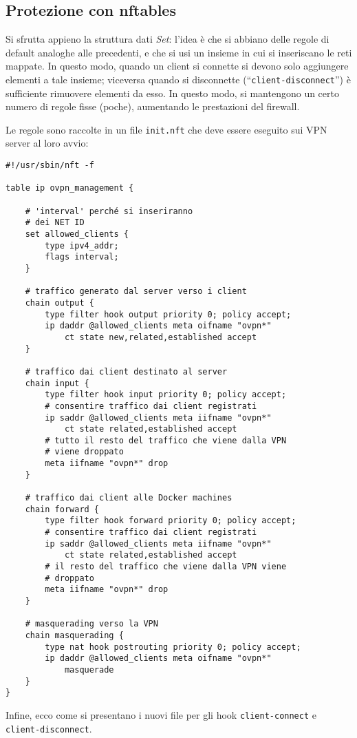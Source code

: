 \subsection{Protezione con nftables}
Si sfrutta appieno la struttura dati \textit{Set}: l'idea è che si abbiano
delle regole di default analoghe alle precedenti, e che si usi un insieme
in cui si inseriscano le reti mappate. In questo modo, quando un client si
connette si devono solo aggiungere elementi a tale insieme; viceversa quando
si disconnette (``\texttt{client-disconnect}'') è sufficiente rimuovere
elementi da esso.
In questo modo, si mantengono un certo numero di regole fisse (poche),
aumentando le prestazioni del firewall.

Le regole sono raccolte in un file \texttt{init.nft} che deve essere
eseguito sui VPN server al loro avvio:
\begin{verbatim}
#!/usr/sbin/nft -f

table ip ovpn_management {
	
	# 'interval' perché si inseriranno
	# dei NET ID
	set allowed_clients {
		type ipv4_addr;
		flags interval;
	}
	
	# traffico generato dal server verso i client
	chain output {
		type filter hook output priority 0; policy accept;
		ip daddr @allowed_clients meta oifname "ovpn*"
			ct state new,related,established accept
	}
	
	# traffico dai client destinato al server
	chain input {
		type filter hook input priority 0; policy accept;
		# consentire traffico dai client registrati
		ip saddr @allowed_clients meta iifname "ovpn*"
			ct state related,established accept
		# tutto il resto del traffico che viene dalla VPN
		# viene droppato
		meta iifname "ovpn*" drop
	}
	
	# traffico dai client alle Docker machines
	chain forward {
		type filter hook forward priority 0; policy accept;
		# consentire traffico dai client registrati
		ip saddr @allowed_clients meta iifname "ovpn*"
			ct state related,established accept
		# il resto del traffico che viene dalla VPN viene
		# droppato
		meta iifname "ovpn*" drop
	}
	
	# masquerading verso la VPN
	chain masquerading {
		type nat hook postrouting priority 0; policy accept;
		ip daddr @allowed_clients meta oifname "ovpn*"
			masquerade
	}
}
\end{verbatim}

Infine, ecco come si presentano i nuovi file per gli hook \texttt{client-connect}
e \texttt{client-disconnect}.

